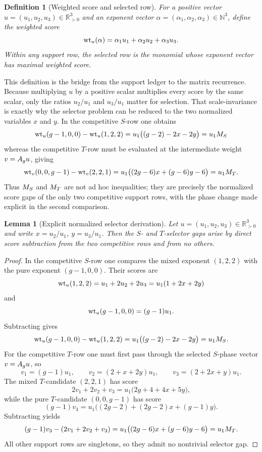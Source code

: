 \documentclass[11pt]{article}
\newtheorem{lemma}[theorem]{Lemma}
\newtheorem{definition}[theorem]{Definition}
\theoremstyle{remark}
\numberwithin{equation}{section}
\begin{document}
\begin{definition}[Weighted score and selected row]\label{def:weight}
For a positive vector \(u=(u_1,u_2,u_3)\in\mathbb R_{>0}^3\) and an exponent
vector \(\alpha=(\alpha_1,\alpha_2,\alpha_3)\in\mathbb N^3\), define the
weighted score
\[
\operatorname{wt}_u(\alpha)=\alpha_1u_1+\alpha_2u_2+\alpha_3u_3.
\]
Within any support row, the selected row is the monomial whose exponent vector
has maximal weighted score.
\end{definition}

This definition is the bridge from the support ledger to the matrix recurrence.
Because multiplying \(u\) by a positive scalar multiplies every score by the
same scalar, only the ratios \(u_2/u_1\) and \(u_3/u_1\) matter for selection.
That scale-invariance is exactly why the selector problem can be reduced to the
two normalized variables \(x\) and \(y\).  In the competitive \(S\)-row one
obtains
\[
\operatorname{wt}_u(g-1,0,0)-\operatorname{wt}_u(1,2,2)=u_1\bigl((g-2)-2x-2y\bigr)=u_1M_S
\]
whereas the competitive \(T\)-row must be evaluated at the intermediate
weight \(v=A_g u\), giving
\[
\operatorname{wt}_v(0,0,g-1)-\operatorname{wt}_v(2,2,1)
=u_1\bigl((2g-6)x+(g-6)y-6\bigr)=u_1M_T.
\]
Thus \(M_S\) and \(M_T\) are not ad hoc inequalities; they are precisely the
normalized score gaps of the only two competitive support rows, with the
phase change made explicit in the second comparison.

\begin{lemma}[Explicit normalized selector derivation]\label{lem:explicit-gaps}
Let \(u=(u_1,u_2,u_3)\in\mathbb R_{>0}^3\) and write \(x=u_2/u_1\),
\(y=u_3/u_1\).  Then the \(S\)- and \(T\)-selector gaps arise by direct score
subtraction from the two competitive rows and from no others.
\end{lemma}

\begin{proof}
In the competitive \(S\)-row one compares the mixed exponent \((1,2,2)\) with
the pure exponent \((g-1,0,0)\).  Their scores are
\[
\operatorname{wt}_u(1,2,2)=u_1+2u_2+2u_3=u_1(1+2x+2y)
\]
and
\[
\operatorname{wt}_u(g-1,0,0)=(g-1)u_1.
\]
Subtracting gives
\[
\operatorname{wt}_u(g-1,0,0)-\operatorname{wt}_u(1,2,2)=u_1\bigl((g-2)-2x-2y\bigr)=u_1M_S.
\]
For the competitive \(T\)-row one must first pass through the selected
\(S\)-phase vector \(v=A_g u\), so
\[
v_1=(g-1)u_1,\qquad v_2=(2+x+2y)u_1,\qquad v_3=(2+2x+y)u_1.
\]
The mixed \(T\)-candidate \((2,2,1)\) has score
\[
2v_1+2v_2+v_3=u_1\bigl(2g+4+4x+5y\bigr),
\]
while the pure \(T\)-candidate \((0,0,g-1)\) has score
\[
(g-1)v_3=u_1\bigl((2g-2)+(2g-2)x+(g-1)y\bigr).
\]
Subtracting yields
\[
(g-1)v_3-(2v_1+2v_2+v_3)
=u_1\bigl((2g-6)x+(g-6)y-6\bigr)
=u_1M_T.
\]
All other support rows are singletons, so they admit no nontrivial selector
gap.
\end{proof}
\end{document}
